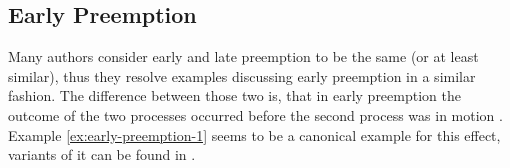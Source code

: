 \documentclass[11pt,a4paper]{book}
\theoremstyle{definition}
\theoremstyle{definition}
\theoremstyle{definition}
\theoremstyle{remark}
\begin{document}
\subsection{Early Preemption}
%
%
%
%
%
Many authors consider early and late preemption to be the same (or at least similar), thus they resolve examples discussing early preemption in a similar fashion.
The difference between those two is, that in early preemption the outcome of the two processes occurred before the second process was in motion \parencite{beckers2018principled}.
Example \ref{ex:early-preemption-1} seems to be a canonical example for this effect, variants of it can be found in \parencite{baumgartner2013regularity,halpern2015graded,weslake2015partial,beckers2016general,blanchard2017cause,wright2017ness,
fenton2017proposed,bochman2018actual,beckers2018principled,batusov2018situation,denecker2019explaining}.
\end{document}

